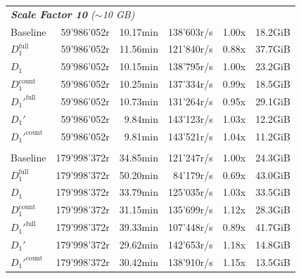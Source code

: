 \begin{longtable}{lrrrrr}
    \multicolumn{6}{l}{\textit{\textbf{Scale Factor 10} ($\sim$10 GB)}} \\
    \nopagebreak
    Baseline              &  59'986'052r          &  10.17min            &  138'603r/s          & 1.00x             & 18.2GiB   \\
    $D_1^{\text{full}}$   &  59'986'052r          &  11.56min            &  121'840r/s          & 0.88x             & 37.7GiB   \\
    \quad $D_1$           &  59'986'052r          &  10.15min            &  138'795r/s          & 1.00x             & 23.2GiB   \\
    $D_1^{\text{count}}$  &  59'986'052r          &  10.25min            &  137'334r/s          & 0.99x             & 18.5GiB   \\
    $D_1'^{\text{full}}$  &  59'986'052r          &  10.73min            &  131'264r/s          & 0.95x             & 29.1GiB   \\
    \quad $D_1'$          &  59'986'052r          &  9.84min             &  143'123r/s          & 1.03x             & 12.2GiB   \\
    $D_1'^{\text{count}}$ &  59'986'052r          &  9.81min             &  143'521r/s          & 1.04x             & 11.2GiB   \\
    \addlinespace

    \multicolumn{6}{l}{\textit{\textbf{Scale Factor 30} ($\sim$30 GB)}} \\
    \nopagebreak
    Baseline              &  179'998'372r         &  34.85min            &  121'247r/s          & 1.00x             & 24.3GiB   \\
    $D_1^{\text{full}}$   &  179'998'372r         &  50.20min            &  84'179r/s           & 0.69x             & 43.0GiB   \\
    \quad $D_1$           &  179'998'372r         &  33.79min            &  125'035r/s          & 1.03x             & 33.5GiB   \\
    $D_1^{\text{count}}$  &  179'998'372r         &  31.15min            &  135'699r/s          & 1.12x             & 28.3GiB   \\
    $D_1'^{\text{full}}$  &  179'998'372r         &  39.33min            &  107'448r/s           & 0.89x             & 41.7GiB   \\
    \quad $D_1'$          &  179'998'372r         &  29.62min            &  142'653r/s          & 1.18x             & 14.8GiB   \\
    $D_1'^{\text{count}}$ &  179'998'372r         &  30.42min            &  138'910r/s          & 1.15x             & 13.5GiB   \\
    \midrule


\end{longtable}
